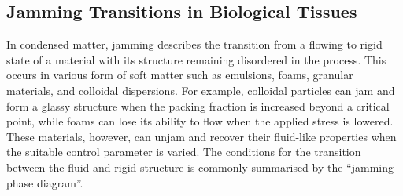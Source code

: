 \documentclass[a4paper,12pt]{article}
\begin{document}
\subsection{Jamming Transitions in Biological Tissues}
%
%
%

In condensed matter, jamming describes the transition from a flowing to rigid state of a material with its structure remaining disordered in the process. This occurs in various form of soft matter such as emulsions, foams, granular materials, and colloidal dispersions\cite{hecke2010}. For example, colloidal particles can jam and form a glassy structure when the packing fraction is increased beyond a critical point, while foams can lose its ability to flow when the applied stress is lowered. These materials, however, can unjam and recover their fluid-like properties when the suitable control parameter is varied. The conditions for the transition between the fluid and rigid structure is commonly summarised by the ``jamming phase diagram''\cite{liu2010}.
\end{document}
